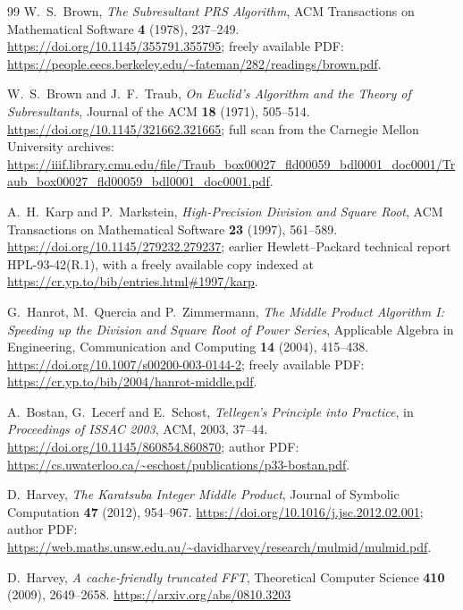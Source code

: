 \documentclass[11pt]{book}
\theoremstyle{definition}
\begin{document}
\begin{thebibliography}{99}
W.~S.~Brown,
\emph{The Subresultant PRS Algorithm},
ACM Transactions on Mathematical Software \textbf{4} (1978), 237--249.
\newline
\url{https://doi.org/10.1145/355791.355795};
freely available PDF:
\url{https://people.eecs.berkeley.edu/~fateman/282/readings/brown.pdf}.

W.~S.~Brown and J.~F.~Traub,
\emph{On Euclid's Algorithm and the Theory of Subresultants},
Journal of the ACM \textbf{18} (1971), 505--514.
\newline
\url{https://doi.org/10.1145/321662.321665};
full scan from the Carnegie Mellon University archives:
\url{https://iiif.library.cmu.edu/file/Traub_box00027_fld00059_bdl0001_doc0001/Traub_box00027_fld00059_bdl0001_doc0001.pdf}.

A.~H.~Karp and P.~Markstein,
\emph{High-Precision Division and Square Root},
ACM Transactions on Mathematical Software \textbf{23} (1997), 561--589.
\newline
\url{https://doi.org/10.1145/279232.279237};
earlier Hewlett--Packard technical report HPL-93-42(R.1), with a freely
available copy indexed at
\url{https://cr.yp.to/bib/entries.html#1997/karp}.

G.~Hanrot, M.~Quercia and P.~Zimmermann,
\emph{The Middle Product Algorithm I: Speeding up the Division and Square Root
of Power Series},
Applicable Algebra in Engineering, Communication and Computing \textbf{14}
(2004), 415--438.
\newline
\url{https://doi.org/10.1007/s00200-003-0144-2};
freely available PDF:
\url{https://cr.yp.to/bib/2004/hanrot-middle.pdf}.

A.~Bostan, G.~Lecerf and E.~Schost,
\emph{Tellegen's Principle into Practice},
in \emph{Proceedings of ISSAC 2003}, ACM, 2003, 37--44.
\newline
\url{https://doi.org/10.1145/860854.860870};
author PDF:
\url{https://cs.uwaterloo.ca/~eschost/publications/p33-bostan.pdf}.

D.~Harvey,
\emph{The Karatsuba Integer Middle Product},
Journal of Symbolic Computation \textbf{47} (2012), 954--967.
\newline
\url{https://doi.org/10.1016/j.jsc.2012.02.001};
author PDF:
\url{https://web.maths.unsw.edu.au/~davidharvey/research/mulmid/mulmid.pdf}.

D.~Harvey,
\emph{A cache-friendly truncated FFT},
Theoretical Computer Science \textbf{410} (2009), 2649--2658.
\newline
\url{https://arxiv.org/abs/0810.3203}


\end{thebibliography}
\end{document}
